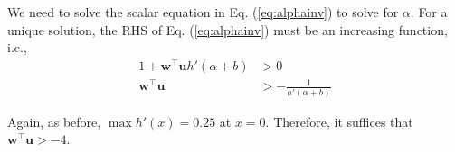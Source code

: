 \documentclass{article}
\begin{document}
We need to solve the scalar equation in Eq. (\ref{eq:alphainv}) to solve for $\alpha$. For a unique solution, the RHS of Eq. (\ref{eq:alphainv}) must be an increasing function, i.e.,
\begin{align*}
    1 + \mathbf{w}^\top\mathbf{u}h'(\alpha + b) &> 0\\
    \mathbf{w}^\top\mathbf{u} &> -\frac{1}{h'(\alpha + b)}
\end{align*}

Again, as before, $\max h'(x) = 0.25$ at $x=0$. Therefore, it suffices that $\mathbf{w}^\top\mathbf{u}>-4$.
\end{document}
